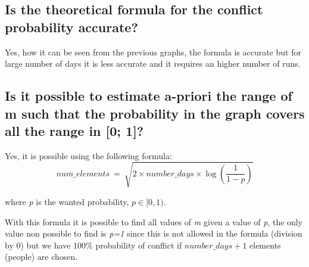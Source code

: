 \documentclass{report}
\begin{document}
{		\subsection{Is the theoretical formula for the conflict probability accurate?}
				Yes, how it can be seen from the previous graphs, the formula is accurate but for large number of days it is less accurate and it requires an higher number of runs.
				
		\subsection{Is it possible to estimate a-priori the range of m such that the probability in the graph covers all the range in [0; 1]?}
				Yes, it is possible using the following formula:
				\[
						num\_elements \: = \: \sqrt{2 \times number\_days \times \log{ \left( \frac{1}{1-p} \right) } }
				\]
				\begin{center}
							where \emph{p} is the wanted probability, $ p \in [0,1)$.
				\end{center}
		With this formula it is possible to find all values of \emph{m} given a value of \emph{p}, the only value non possible to find is \emph{p=1} since this is not allowed in the formula (division by 0) but we have $100\%$ probability of conflict if $number\_days+1$ elements (people) are chosen.
		
}
\end{document}
